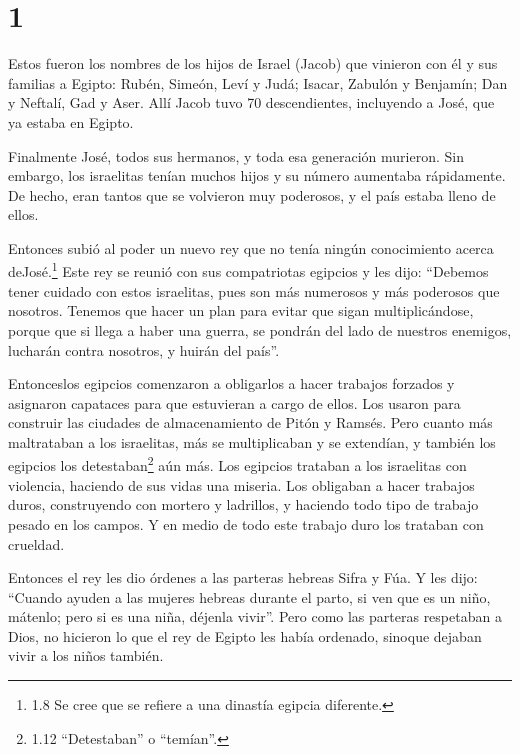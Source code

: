 \hypertarget{section}{%
\section{1}\label{section}}

 Estos fueron los nombres de los hijos de Israel (Jacob) que
vinieron con él y sus familias a Egipto:  Rubén, Simeón,
Leví y Judá;  Isacar, Zabulón y Benjamín;  Dan y
Neftalí, Gad y Aser.  Allí Jacob tuvo 70 descendientes,
incluyendo a José, que ya estaba en Egipto.

 Finalmente José, todos sus hermanos, y toda esa generación
murieron.  Sin embargo, los israelitas tenían muchos hijos y
su número aumentaba rápidamente. De hecho, eran tantos que se volvieron
muy poderosos, y el país estaba lleno de ellos.

 Entonces subió al poder un nuevo rey que no tenía ningún
conocimiento acerca deJosé.\footnote{1.8 Se cree que se refiere a una
  dinastía egipcia diferente.}  Este rey se reunió con sus
compatriotas egipcios y les dijo: ``Debemos tener cuidado con estos
israelitas, pues son más numerosos y más poderosos que nosotros.
 Tenemos que hacer un plan para evitar que sigan
multiplicándose, porque que si llega a haber una guerra, se pondrán del
lado de nuestros enemigos, lucharán contra nosotros, y huirán del
país''.

 Entonceslos egipcios comenzaron a obligarlos a hacer
trabajos forzados y asignaron capataces para que estuvieran a cargo de
ellos. Los usaron para construir las ciudades de almacenamiento de Pitón
y Ramsés.  Pero cuanto más maltrataban a los israelitas,
más se multiplicaban y se extendían, y también los egipcios los
detestaban\footnote{1.12 ``Detestaban'' o ``temían''.} aún más.
 Los egipcios trataban a los israelitas con violencia,
 haciendo de sus vidas una miseria. Los obligaban a hacer
trabajos duros, construyendo con mortero y ladrillos, y haciendo todo
tipo de trabajo pesado en los campos. Y en medio de todo este trabajo
duro los trataban con crueldad.

 Entonces el rey les dio órdenes a las parteras hebreas
Sifra y Fúa.  Y les dijo: ``Cuando ayuden a las mujeres
hebreas durante el parto, si ven que es un niño, mátenlo; pero si es una
niña, déjenla vivir''.  Pero como las parteras respetaban a
Dios, no hicieron lo que el rey de Egipto les había ordenado, sinoque
dejaban vivir a los niños también.

